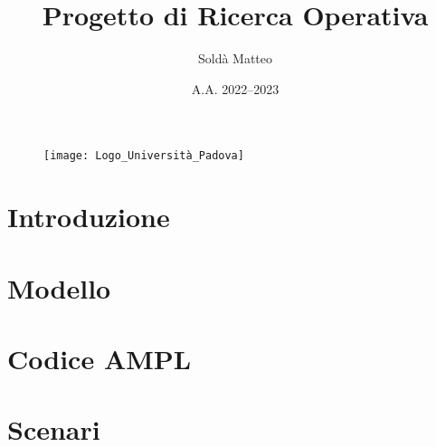 \documentclass[10pt, a4paper]{article}
\title{Progetto di Ricerca Operativa}
\author{Soldà Matteo }
\date{A.A. 2022--2023}
\begin{document}
\begin{figure}
    \centering
    \texttt{[image: Logo\_Università\_Padova]}
\end{figure}

\maketitle

\newpage
\tableofcontents

\newpage
\section{Introduzione}


\newpage
\section{Modello}


\newpage
\section{Codice AMPL}

\newpage
\section{Scenari}

\end{document}
